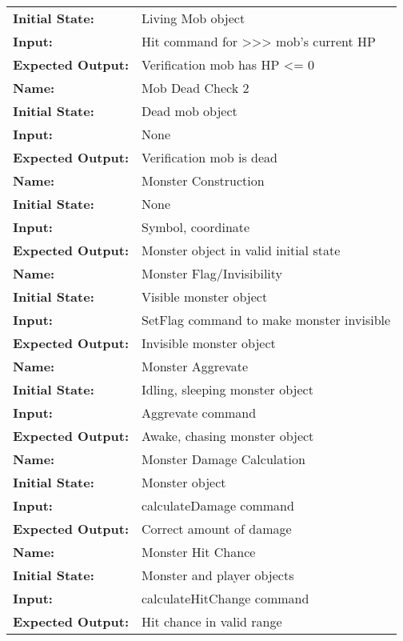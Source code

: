 \documentclass[12pt, titlepage]{article}
\begin{document}
\begin{center}
\begin{longtable}{ l | p{10cm} }
				\textbf{Initial State:} & Living Mob object\\
				\textbf{Input:} & Hit command for >>> mob's current HP\\
				\textbf{Expected Output:} & Verification mob has HP <= 0\\[0.6em]
				\hline
				\rule{0pt}{1.5em}\textbf{Name:} & Mob Dead Check 2\\
				\textbf{Initial State:} & Dead mob object\\
				\textbf{Input:} & None\\
				\textbf{Expected Output:} & Verification mob is dead\\[0.6em]
				\hline
				\rule{0pt}{1.5em}\textbf{Name:} & Monster Construction\\
				\textbf{Initial State:} & None\\
				\textbf{Input:} & Symbol, coordinate\\
				\textbf{Expected Output:} & Monster object in valid initial state\\[0.6em]
				\hline
				\rule{0pt}{1.5em}\textbf{Name:} & Monster Flag/Invisibility\\
				\textbf{Initial State:} & Visible monster object\\
				\textbf{Input:} & SetFlag command to make monster invisible\\
				\textbf{Expected Output:} & Invisible monster object\\[0.6em]
				\hline
				\rule{0pt}{1.5em}\textbf{Name:} & Monster Aggrevate\\
				\textbf{Initial State:} & Idling, sleeping monster object\\
				\textbf{Input:} & Aggrevate command\\
				\textbf{Expected Output:} & Awake, chasing monster object\\[0.6em]
				\hline
				\rule{0pt}{1.5em}\textbf{Name:} & Monster Damage Calculation\\
				\textbf{Initial State:} & Monster object\\
				\textbf{Input:} & calculateDamage command\\
				\textbf{Expected Output:} & Correct amount of damage\\[0.6em]
				\hline
				\rule{0pt}{1.5em}\textbf{Name:} & Monster Hit Chance\\
				\textbf{Initial State:} & Monster and player objects\\
				\textbf{Input:} & calculateHitChange command\\
				\textbf{Expected Output:} & Hit chance in valid range\\[0.6em]

\end{longtable}
\end{center}
\end{document}
